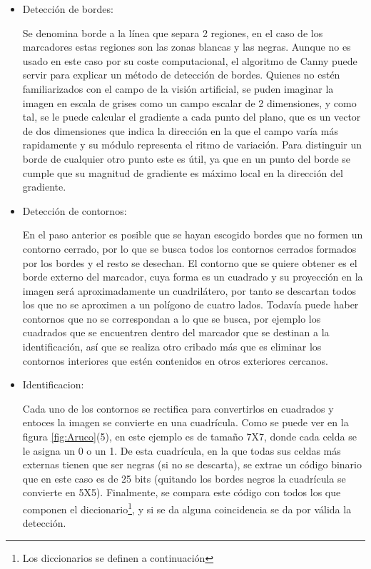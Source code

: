 \begin{itemize}
\item Detección de bordes: 

	Se denomina borde a la línea que separa 2 regiones, en el caso de los marcadores estas regiones son las zonas blancas y las negras. Aunque no es usado  en este caso por su coste computacional, el algoritmo de Canny puede servir para explicar un método de detección de bordes. 
	Quienes no estén familiarizados con el campo de la visión artificial, se puden imaginar la imagen en escala de grises como un campo escalar de 2 dimensiones, y como tal, se le puede calcular el gradiente a cada punto del plano, que es un vector de dos dimensiones que indica la dirección en la que el campo varía más rapidamente y su módulo representa el ritmo de variación. Para distinguir un borde de cualquier otro punto este es útil, ya que en un punto del borde se cumple que su magnitud de gradiente es máximo local en la dirección del gradiente.

\item Detección de contornos:

	En el paso anterior es posible que se hayan escogido bordes que no formen un contorno cerrado, por lo que se busca todos los contornos cerrados formados por los bordes y el resto se desechan. 
	El contorno que se quiere obtener es el borde externo del marcador, cuya forma es un cuadrado y su proyección en la imagen será aproximadamente un cuadrilátero, por tanto se descartan todos los que no se aproximen a un polígono de cuatro lados. Todavía puede haber contornos que no se correspondan a lo que se busca, por ejemplo los cuadrados que se encuentren dentro del marcador que se destinan a la identificación, así que se realiza otro cribado más que es eliminar los contornos interiores que estén contenidos en otros exteriores cercanos. 
	
\item Identificacion: 

	Cada uno de los contornos se rectifica para convertirlos en cuadrados y entoces la imagen se convierte en una cuadrícula. Como se puede ver en la figura \ref{fig:Aruco}{\footnotesize(5)}, en este ejemplo es de tamaño 7X7, donde cada celda se le asigna un 0 o un 1. De esta cuadrícula, en la que todas sus celdas más externas tienen que ser negras (si no se descarta), se extrae un código binario que en este caso es de 25 bits (quitando los bordes negros la cuadrícula se convierte en 5X5). Finalmente, se compara este código con todos los que componen el diccionario\footnote{Los diccionarios se definen a continuación}, y si se da alguna coincidencia se da por válida la detección.   
\end{itemize}

